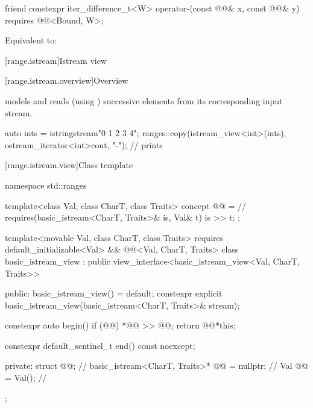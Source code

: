 \begin{itemdecl}
friend constexpr iter_difference_t<W> operator-(const @@& x, const @@& y)
  requires @@<Bound, W>;
\end{itemdecl}

\begin{itemdescr}
\pnum
\effects
Equivalent to: 
\end{itemdescr}

[range.istream]{Istream view}

[range.istream.overview]{Overview}

\pnum
{} models  and
reads (using ) successive elements
from its corresponding input stream.

\pnum
\begin{example}
\begin{codeblock}
auto ints = istringstream{"0 1  2   3     4"};
ranges::copy(istream_view<int>(ints), ostream_iterator<int>{cout, "-"});
// prints 
\end{codeblock}
\end{example}

[range.istream.view]{Class template }

%
\begin{codeblock}
namespace std::ranges {
  template<class Val, class CharT, class Traits>
    concept @@ =                // \expos
      requires(basic_istream<CharT, Traits>& is, Val& t) {
         is >> t;
      };

  template<movable Val, class CharT, class Traits>
    requires default_initializable<Val> &&
             @@<Val, CharT, Traits>
  class basic_istream_view : public view_interface<basic_istream_view<Val, CharT, Traits>> {
  public:
    basic_istream_view() = default;
    constexpr explicit basic_istream_view(basic_istream<CharT, Traits>& stream);

    constexpr auto begin()
    {
      if (@@) {
        *@@ >> @@;
      }
      return @@{*this};
    }

    constexpr default_sentinel_t end() const noexcept;

  private:
    struct @@;                                    // \expos
    basic_istream<CharT, Traits>* @@ = nullptr;    // \expos
    Val @@ = Val();                                // \expos
  };
}
\end{codeblock}

